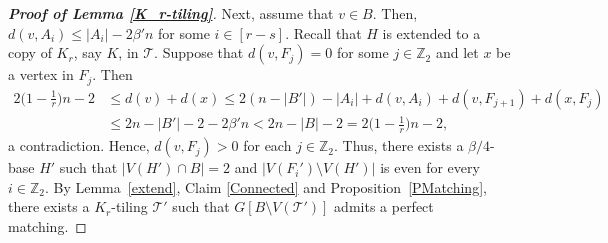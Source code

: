 \documentclass[11pt, a4paper]{article}
\theoremstyle{definition}
\newcommand{\<}{\subseteq}
\begin{document}
\begin{proof}[\bf Proof of Lemma \ref{K_r-tiling}]
Next, assume that $v\in B$. %
Then, $d(v,A_i)\le |A_i|-2\beta'n$ for some $i\in [r-s]$.  %
Recall that $H$ is extended to a copy of $K_r$, say $K$, in $\mathcal{T}$. %
Suppose that $d(v,F_{j})=0$ for some $j\in \mathbb{Z}_2$ and let $x$ be a vertex in $F_{j}$. Then\allowdisplaybreaks
\begin{align*}
2\Big(1-\frac{1}{r}\Big)n-2&\leq d(v)+d(x)\leq 2(n-|B'|)-|A_i|+d(v,A_i)+d(v,F_{j+1})+d(x,F_{j})\\
&\leq 2n-|B'|-2-2\beta'n< 2n-|B|-2=2\Big(1-\frac{1}{r}\Big)n-2,
\end{align*}
a contradiction. 
Hence, $d(v,F_j)>0$ for each $j\in \mathbb{Z}_2$.  %
Thus, there exists a $\beta/4$-base $H'$ such that $|V(H')\cap B|=2$ and $|V(F_i')\setminus V(H')|$ is even for every $i\in \mathbb{Z}_2$. By Lemma~\ref{extend}, Claim \ref{Connected} and Proposition~\ref{PMatching}, there exists a $K_r$-tiling $\mathcal{T}'$ such that $G[B\setminus V(\mathcal{T}')]$ admits a perfect matching.



\end{proof}
\end{document}
